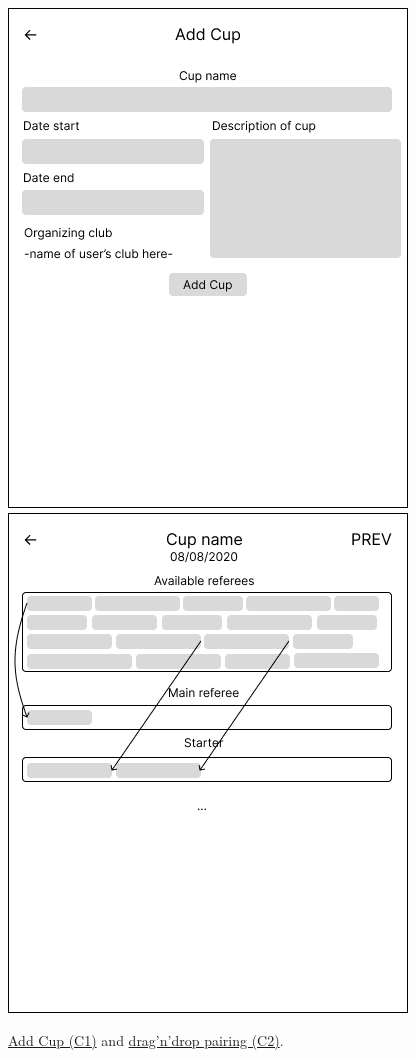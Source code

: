 \begin{figure}[h]	
	\centering
    \includegraphics[scale=0.457]{img/A-new-cup.png}
\includegraphics[scale=0.457]{img/A-pairing.png}
\caption{\underline{Add Cup (C1)} and \underline{drag'n'drop pairing (C2)}.}
\label{fig2.5:feprivatepages2}
\end{figure}
\newpage
